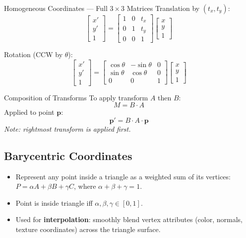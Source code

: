 \documentclass[11pt]{article}
\begin{document}
\begin{formulabox}{Homogeneous Coordinates — Full $3\times3$ Matrices}
Translation by $(t_x, t_y)$:
$$\begin{bmatrix} x' \\ y' \\ 1 \end{bmatrix} = \begin{bmatrix} 1 & 0 & t_x \\ 0 & 1 & t_y \\ 0 & 0 & 1 \end{bmatrix} \begin{bmatrix} x \\ y \\ 1 \end{bmatrix}$$

Rotation (CCW by $\theta$):
$$\begin{bmatrix} x' \\ y' \\ 1 \end{bmatrix} = \begin{bmatrix} \cos\theta & -\sin\theta & 0 \\ \sin\theta & \cos\theta & 0 \\ 0 & 0 & 1 \end{bmatrix} \begin{bmatrix} x \\ y \\ 1 \end{bmatrix}$$
\end{formulabox}

\begin{formulabox}{Composition of Transforms}
To apply transform $A$ then $B$:
$$M = B \cdot A$$
Applied to point $\mathbf{p}$:
$$\mathbf{p}' = B \cdot A \cdot \mathbf{p}$$
\emph{Note: rightmost transform is applied first.}
\end{formulabox}

\subsection{Barycentric Coordinates}
\begin{itemize}
    \item Represent any point inside a triangle as a weighted sum of its vertices: $P = \alpha A + \beta B + \gamma C$, where $\alpha+\beta+\gamma=1$.
    \item Point is inside triangle iff $\alpha, \beta, \gamma \in [0, 1]$.
    \item Used for \textbf{interpolation}: smoothly blend vertex attributes (color, normals, texture coordinates) across the triangle surface.
\end{itemize}
\end{document}
